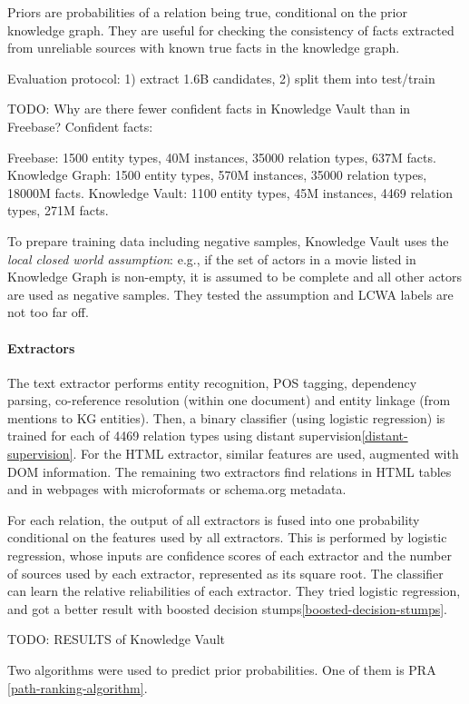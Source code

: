Priors are probabilities of a relation being true, conditional
on the prior knowledge graph. They are useful for checking the consistency of
facts extracted from unreliable sources with known true facts in the knowledge
graph.

Evaluation protocol: 1) extract 1.6B candidates, 2) split them into test/train

TODO: Why are there fewer confident facts in Knowledge Vault than in Freebase?
Confident facts:

Freebase: 1500 entity types, 40M instances, 35000 relation types, 637M
facts.
Knowledge Graph: 1500 entity types, 570M instances, 35000 relation types, 18000M
facts.
Knowledge Vault: 1100 entity types, 45M instances, 4469 relation types, 271M
facts.

To prepare training data including negative samples, Knowledge Vault uses the
\textit{local closed world assumption}: e.g., if the set of actors in a movie listed
in Knowledge Graph is non-empty, it is assumed to be complete and all other
actors are used as negative samples.
They tested the assumption and LCWA labels are not too far off.

\paragraph{Extractors}
The text extractor performs entity recognition, POS tagging, dependency parsing,
co-reference resolution (within one document) and entity linkage (from mentions
to KG entities).
Then, a binary classifier (using logistic regression) is trained for each of
4469 relation types using distant supervision\ref{distant-supervision}.
For the HTML extractor, similar features are used, augmented with DOM
information.
The remaining two extractors find relations in HTML tables and in webpages
with microformats or schema.org metadata.

For each relation, the output of all extractors is fused into one probability
conditional on the features used by all extractors. This is performed by
logistic regression, whose inputs are confidence scores of each extractor and
the number of sources used by each extractor, represented as its square root.
The classifier can learn the relative reliabilities of each extractor.
They tried logistic regression, and got a better result with boosted decision
stumps\ref{boosted-decision-stumps}.

TODO: RESULTS of Knowledge Vault

Two algorithms were used to predict prior probabilities.
One of them is PRA \ref{path-ranking-algorithm}.

